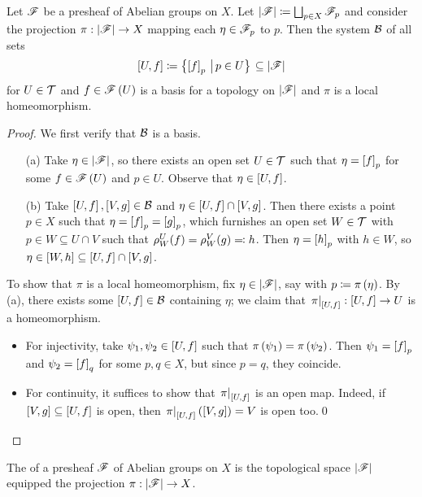 \documentclass[../Moduli_Spaces_of_Riemann_Surfaces.tex]{subfiles}
\begin{document}
    \begin{proposition}\label{2.2:prp:basis_stalk}
        Let $\mathscr{F}$ be a presheaf of Abelian groups on $X$. Let $\left|\mathscr{F}\right|\coloneqq\bigsqcup_{p\in X}\mathscr{F}_p$ and consider the projection $\pi:\left|\mathscr{F}\right|\to X$ mapping each $\eta\in\mathscr{F}_p$ to $p$. Then the system $\mathcal{B}$ of all sets
        \begin{equation*}
            \left[U,f\right]\coloneqq\bigl\{\left[f\right]_p\,\left|\,p\in U\bigr\}\right.\subseteq\left|\mathscr{F}\right|
        \end{equation*}
        for $U\in\mathcal{T}$ and $f\in\mathscr{F}\left(U\right)$ is a basis for a topology on $\left|\mathscr{F}\right|$ and $\pi$ is a local homeomorphism.
    \end{proposition}
    \begin{proof}
        We first verify that $\mathcal{B}$ is a basis.
        \begin{enumerate}
            \item[(a)] Take $\eta\in\left|\mathscr{F}\right|$, so there exists an open set $U\in\mathcal{T}$ such that $\eta=\left[f\right]_p$ for some $f\in\mathscr{F}\left(U\right)$ and $p\in U$. Observe that $\eta\in\left[U,f\right]$.
            \item[(b)] Take $\left[U,f\right],\left[V,g\right]\in\mathcal{B}$ and $\eta\in\left[U,f\right]\cap\left[V,g\right]$. Then there exists a point $p\in X$ such that $\eta=\left[f\right]_p=\left[g\right]_p$, which furnishes an open set $W\in\mathcal{T}$ with $p\in W\subseteq U\cap V$ such that $\rho^U_W\!\left(f\right)=\rho^V_W\!\left(g\right)\eqqcolon h$. Then $\eta=\left[h\right]_p$ with $h\in W$, so $\eta\in\left[W,h\right]\subseteq\left[U,f\right]\cap\left[V,g\right]$.
        \end{enumerate}
        To show that $\pi$ is a local homeomorphism, fix $\eta\in\left|\mathscr{F}\right|$, say with $p\coloneqq\pi\left(\eta\right)$. By (a), there exists some $\left[U,f\right]\in\mathcal{B}$ containing $\eta$; we claim that $\left.\pi\right|_{\left[U,f\right]}:\left[U,f\right]\to U$ is a homeomorphism.
        \begin{itemize}
            \item For injectivity, take $\psi_1,\psi_2\in\left[U,f\right]$ such that $\pi\left(\psi_1\right)=\pi\left(\psi_2\right)$. Then $\psi_1=\left[f\right]_p$ and $\psi_2=\left[f\right]_q$ for some $p,q\in X$, but since $p=q$, they coincide.
            \item For continuity, it suffices to show that $\left.\pi\right|_{\left[U,f\right]}$ is an open map. Indeed, if $\left[V,g\right]\subseteq\left[U,f\right]$ is open, then $\left.\pi\right|_{\left[U,f\right]}\left(\left[V,g\right]\right)=V$ is open too.\qed
        \end{itemize}
    \end{proof}
    \begin{definition}
        The  of a presheaf $\mathscr{F}$ of Abelian groups on $X$ is the topological space $\left|\mathscr{F}\right|$ equipped the projection $\pi:\left|\mathscr{F}\right|\to X$.
    \end{definition}
\end{document}
